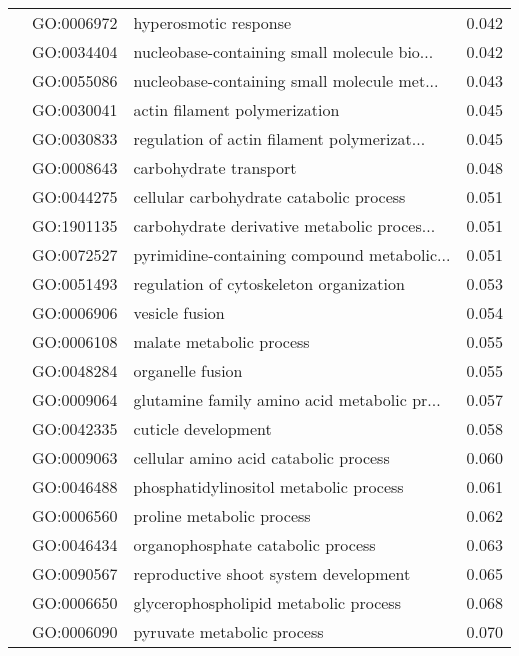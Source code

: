 \begin{longtable}{lllr}
   & GO:0006972 &                        hyperosmotic response &         0.042 \\
   & GO:0034404 &  nucleobase-containing small molecule bio... &         0.042 \\
   & GO:0055086 &  nucleobase-containing small molecule met... &         0.043 \\
   & GO:0030041 &                actin filament polymerization &         0.045 \\
   & GO:0030833 &  regulation of actin filament polymerizat... &         0.045 \\
   & GO:0008643 &                       carbohydrate transport &         0.048 \\
   & GO:0044275 &      cellular carbohydrate catabolic process &         0.051 \\
   & GO:1901135 &  carbohydrate derivative metabolic proces... &         0.051 \\
   & GO:0072527 &  pyrimidine-containing compound metabolic... &         0.051 \\
   & GO:0051493 &      regulation of cytoskeleton organization &         0.053 \\
   & GO:0006906 &                               vesicle fusion &         0.054 \\
   & GO:0006108 &                     malate metabolic process &         0.055 \\
   & GO:0048284 &                             organelle fusion &         0.055 \\
   & GO:0009064 &  glutamine family amino acid metabolic pr... &         0.057 \\
   & GO:0042335 &                          cuticle development &         0.058 \\
   & GO:0009063 &        cellular amino acid catabolic process &         0.060 \\
   & GO:0046488 &       phosphatidylinositol metabolic process &         0.061 \\
   & GO:0006560 &                    proline metabolic process &         0.062 \\
   & GO:0046434 &            organophosphate catabolic process &         0.063 \\
   & GO:0090567 &        reproductive shoot system development &         0.065 \\
   & GO:0006650 &        glycerophospholipid metabolic process &         0.068 \\
   & GO:0006090 &                   pyruvate metabolic process &         0.070 \\

\end{longtable}
